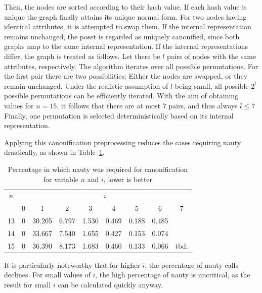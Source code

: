\documentclass[10pt,journal,compsoc]{IEEEtran}
\begin{document}
Then, the nodes are sorted according to their hash value.
If each hash value is unique the graph finally attains its unique normal form.
For two nodes having identical attributes, it is attempted to swap them.
If the internal representation remains unchanged, the poset is regarded as uniquely canonified, since both graphs map to the same internal representation.
If the internal representations differ, the graph is treated as follows.
Let there be $l$ pairs of nodes with the same attributes, respectively.
The algorithm iterates over all possible permutations.
For the first pair there are two possibilities: Either the nodes are swapped, or they remain unchanged.
Under the realistic assumption of $l$ being small, all possible $2^l$ possible permutations can be efficiently iterated.
With the aim of obtaining values for $n = 15$, it follows that there are at most $7$ pairs, and thus always $l \leq 7$
Finally, one permutation is selected deterministically based on its internal representation.

Applying this canonification preprocessing reduces the cases requiring nauty drastically, as shown in Table~\ref{table:nauty-ratio}.

\begin{table}
  \begin{tabular}{c|cccccccc}
    $n$ & \multicolumn{8}{c}{$i$}                                                         \\
        & 0                       & 1      & 2     & 3     & 4     & 5     & 6     & 7    \\ \hline
    13  & 0                       & 30.205 & 6.797 & 1.530 & 0.469 & 0.188 & 0.485        \\
    14  & 0                       & 33.667 & 7.540 & 1.655 & 0.427 & 0.153 & 0.074        \\
    15  & 0                       & 36.390 & 8.173 & 1.683 & 0.460 & 0.133 & 0.066 & tbd. \\ %
  \end{tabular}
  \centering
  \caption{Percentage in which nauty was required for canonification for variable $n$ and $i$, lower is better}
  \label{table:nauty-ratio}
\end{table}

It is particularly noteworthy that for higher $i$, the percentage of nauty calls declines.
For small values of $i$, the high percentage of nauty is uncritical, as the result for small $i$ can be calculated quickly anyway.
\end{document}
